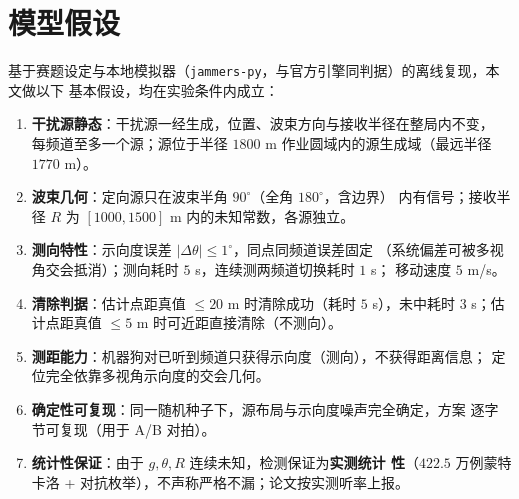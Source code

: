 \section{模型假设}

基于赛题设定与本地模拟器（\texttt{jammers-py}，与官方引擎同判据）的离线复现，本文做以下
基本假设，均在实验条件内成立：

\begin{enumerate}
  \item \textbf{干扰源静态}：干扰源一经生成，位置、波束方向与接收半径在整局内不变，
        每频道至多一个源；源位于半径 $1800$ m 作业圆域内的源生成域（最远半径
        $1770$ m）。
  \item \textbf{波束几何}：定向源只在波束半角 $90^\circ$（全角 $180^\circ$，含边界）
        内有信号；接收半径 $R$ 为 $[1000,1500]$ m 内的未知常数，各源独立。
  \item \textbf{测向特性}：示向度误差 $|\Delta\theta| \le 1^\circ$，同点同频道误差固定
        （系统偏差可被多视角交会抵消）；测向耗时 $5$ s，连续测两频道切换耗时 $1$ s；
        移动速度 $5$ m/s。
  \item \textbf{清除判据}：估计点距真值 $\le 20$ m 时清除成功（耗时 $5$ s），未中耗时
        $3$ s；估计点距真值 $\le 5$ m 时可近距直接清除（不测向）。
  \item \textbf{测距能力}：机器狗对已听到频道只获得示向度（测向），不获得距离信息；
        定位完全依靠多视角示向度的交会几何。
  \item \textbf{确定性可复现}：同一随机种子下，源布局与示向度噪声完全确定，方案
        逐字节可复现（用于 A/B 对拍）。
  \item \textbf{统计性保证}：由于 $g,\theta,R$ 连续未知，检测保证为\textbf{实测统计
        性}（$422.5$ 万例蒙特卡洛 + 对抗枚举），不声称严格不漏；论文按实测听率上报。
\end{enumerate}